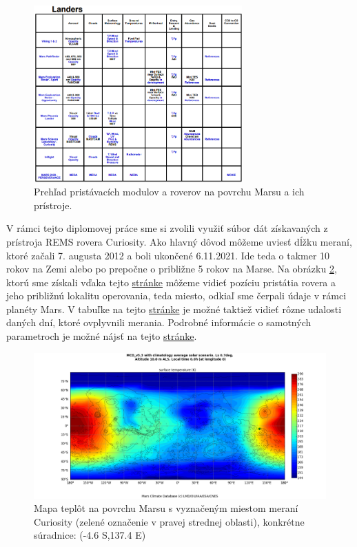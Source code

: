 \begin{figure}[!htbp]
  \centering
  \includegraphics[width=8cm]{img/landers.png}
  \caption{Prehľad pristávacích modulov a roverov na povrchu Marsu a ich prístroje.}
  \label{landers}
\end{figure}

V rámci tejto diplomovej práce sme si zvolili využiť súbor dát získavaných z prístroja REMS rovera Curiosity. Ako hlavný dôvod môžeme uviesť dĺžku meraní, ktoré začali 7. augusta 2012 a boli ukončené 6.11.2021. Ide teda o takmer 10 rokov na Zemi alebo po prepočne o približne 5 rokov na Marse. Na obrázku \ref{curiosity_landing_site}, ktorú sme získali vďaka tejto \href{http://www-mars.lmd.jussieu.fr/mars/access.html}{stránke} môžeme vidieť pozíciu pristátia rovera a jeho približnú lokalitu operovania, teda miesto, odkiaľ sme čerpali údaje v rámci planéty Mars. V tabuľke na tejto \href{https://atmos.nmsu.edu/PDS/data/mslrem_1001/DOCUMENT/DATA_EVENTS.TXT}{stránke} je možné taktiež vidieť rôzne udalosti daných dní, ktoré ovplyvnili merania. Podrobné informácie o samotných parametroch je možné nájsť na tejto \href{https://atmos.nmsu.edu/PDS/data/mslrem_1001/DOCUMENT/REMS_RDR_SIS.TXT}{stránke}.
\begin{figure}[!htbp]
  \centering
  \includegraphics[width=14cm]{img/surface_temp.png}
  \caption{Mapa teplôt na povrchu Marsu s vyznačeným miestom meraní Curiosity (zelené označenie v pravej strednej oblasti), konkrétne súradnice: (-4.6 S,137.4 E)}
  \label{curiosity_landing_site}
\end{figure}
\newpage

